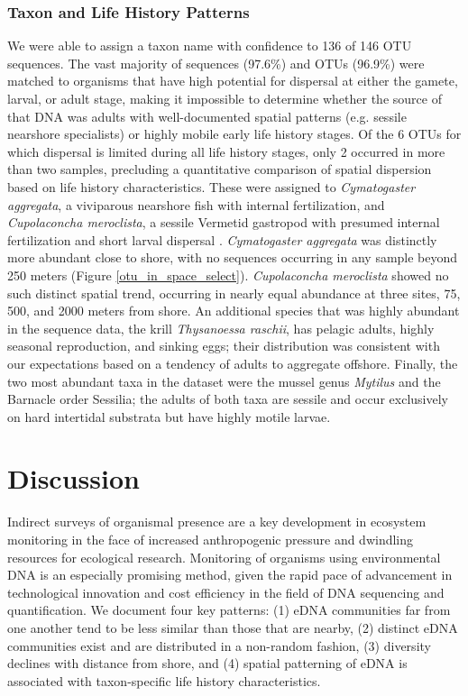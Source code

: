 \documentclass[11pt,letterpaper]{article} %
\begin{document}
\subsubsection*{Taxon and Life History Patterns}
We were able to assign a taxon name with confidence to 136 of 146 OTU sequences. The vast majority of sequences (97.6\%) and OTUs (96.9\%) were matched to organisms that have high potential for dispersal at either the gamete, larval, or adult stage, making it impossible to determine whether the source of that DNA was adults with well-documented spatial patterns (e.g. sessile nearshore specialists) or highly mobile early life history stages. Of the 6 OTUs for which dispersal is limited during all life history stages, only 2 occurred in more than two samples, precluding a quantitative comparison of spatial dispersion based on life history characteristics. These were assigned to \textit{Cymatogaster aggregata}, a viviparous nearshore fish with internal fertilization, and \textit{Cupolaconcha meroclista}, a sessile Vermetid gastropod with presumed internal fertilization and short larval dispersal \citep{Strathmann2006, Phillips2010, Calvo2004}. \textit{Cymatogaster aggregata} was distinctly more abundant close to shore, with no sequences occurring in any sample beyond 250 meters (Figure \ref{otu_in_space_select}). \textit{Cupolaconcha meroclista} showed no such distinct spatial trend, occurring in nearly equal abundance at three sites, 75, 500, and 2000 meters from shore. An additional species that was highly abundant in the sequence data, the krill \textit{Thysanoessa raschii}, has pelagic adults, highly seasonal reproduction, and sinking eggs; their distribution was consistent with our expectations based on a tendency of adults to aggregate offshore. Finally, the two most abundant taxa in the dataset were the mussel genus \textit{Mytilus} and the Barnacle order Sessilia; the adults of both taxa are sessile and occur exclusively on hard intertidal substrata but have highly motile larvae.


\section*{Discussion}
Indirect surveys of organismal presence are a key development in ecosystem monitoring in the face of increased anthropogenic pressure and dwindling resources for ecological research. Monitoring of organisms using environmental DNA is an especially promising method, given the rapid pace of advancement in technological innovation and cost efficiency in the field of DNA sequencing and quantification. We document four key patterns: (1) eDNA communities far from one another tend to be less similar than those that are nearby, (2) distinct eDNA communities exist and are distributed in a non-random fashion, (3) diversity declines with distance from shore, and (4) spatial patterning of eDNA is associated with taxon-specific life history characteristics.
\end{document}
